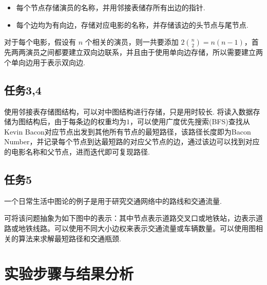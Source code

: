 \documentclass[12pt, a4paper, oneside]{ctexart}
\numberwithin{equation}{section}  %
\begin{document}
\begin{itemize}
    \item 每个节点存储演员的名称，并用邻接表储存所有出边的指针.
    \item 每个边均为有向边，存储对应电影的名称，并存储该边的头节点与尾节点.
\end{itemize}

对于每个电影，假设有 $n$ 个相关的演员，则一共要添加 $2\binom{n}{2} = n(n-1)$，首先两两演员之间都要建立双向边联系，并且由于使用单向边存储，所以需要建立两个单向边用于表示双向边.

\subsection{任务3,4}
使用邻接表存储图结构，可以对中图结构进行存储，只是用时较长. 将读入数据存储为图结构后，由于每条边的权重均为$1$，可以使用广度优先搜索(BFS)查找从Kevin Bacon对应节点出发到其他所有节点的最短路径，该路径长度即为Bacon Number，并记录每个节点到达最短路的对应父节点的边，通过该边可以找到对应的电影名称和父节点，进而迭代即可复现路径.

\subsection{任务5}
一个日常生活中图论的例子是用于研究交通网络中的路线和交通流量.

可将该问题抽象为如下图中的表示：其中节点表示道路交叉口或地铁站，边表示道路或地铁线路。可以使用不同大小边权来表示交通流量或车辆数量。可以使用图相关的算法来求解最短路径和交通瓶颈.

\section{实验步骤与结果分析}
\end{document}
